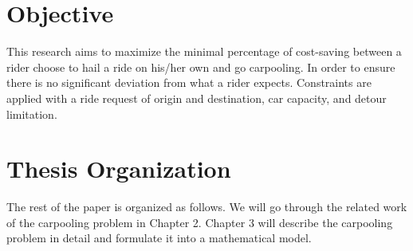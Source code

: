 \section{Objective}

This research aims to maximize the minimal percentage of cost-saving between a rider choose to hail a ride on his/her own and go carpooling. In order to ensure there is no significant deviation from what a rider expects. Constraints are applied with a ride request of origin and destination, car capacity, and detour limitation.

\section{Thesis Organization}

The rest of the paper is organized as follows. We will go through the related work of the carpooling problem in Chapter 2. Chapter 3 will describe the carpooling problem in detail and formulate it into a mathematical model.